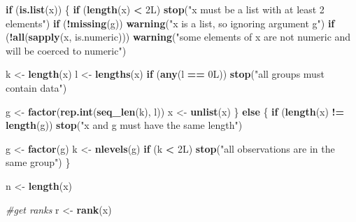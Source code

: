 \documentclass[
]{article}
\newenvironment{Shaded}{\begin{snugshade}}{\end{snugshade}}
\newcommand{\CommentTok}[1]{\textcolor[rgb]{0.56,0.35,0.01}{\textit{#1}}}
\newcommand{\ControlFlowTok}[1]{\textcolor[rgb]{0.13,0.29,0.53}{\textbf{#1}}}
\newcommand{\DataTypeTok}[1]{\textcolor[rgb]{0.13,0.29,0.53}{#1}}
\newcommand{\DecValTok}[1]{\textcolor[rgb]{0.00,0.00,0.81}{#1}}
\newcommand{\FunctionTok}[1]{\textcolor[rgb]{0.13,0.29,0.53}{\textbf{#1}}}
\newcommand{\NormalTok}[1]{#1}
\newcommand{\OtherTok}[1]{\textcolor[rgb]{0.56,0.35,0.01}{#1}}
\newcommand{\SpecialCharTok}[1]{\textcolor[rgb]{0.81,0.36,0.00}{\textbf{#1}}}
\newcommand{\StringTok}[1]{\textcolor[rgb]{0.31,0.60,0.02}{#1}}
\begin{document}
\begin{Shaded}
\begin{Highlighting}[]
  \ControlFlowTok{if}\NormalTok{ (}\FunctionTok{is.list}\NormalTok{(x)) \{}
    \ControlFlowTok{if}\NormalTok{ (}\FunctionTok{length}\NormalTok{(x) }\SpecialCharTok{\textless{}} \DecValTok{2}\DataTypeTok{L}\NormalTok{)}
      \FunctionTok{stop}\NormalTok{(}\StringTok{"\textquotesingle{}x\textquotesingle{} must be a list with at least 2 elements"}\NormalTok{)}
    \ControlFlowTok{if}\NormalTok{ (}\SpecialCharTok{!}\FunctionTok{missing}\NormalTok{(g))}
      \FunctionTok{warning}\NormalTok{(}\StringTok{"\textquotesingle{}x\textquotesingle{} is a list, so ignoring argument \textquotesingle{}g\textquotesingle{}"}\NormalTok{)}
    \ControlFlowTok{if}\NormalTok{ (}\SpecialCharTok{!}\FunctionTok{all}\NormalTok{(}\FunctionTok{sapply}\NormalTok{(x, is.numeric)))}
      \FunctionTok{warning}\NormalTok{(}\StringTok{"some elements of \textquotesingle{}x\textquotesingle{} are not numeric and will be coerced to numeric"}\NormalTok{)}
    
\NormalTok{    k }\OtherTok{\textless{}{-}} \FunctionTok{length}\NormalTok{(x)}
\NormalTok{    l }\OtherTok{\textless{}{-}} \FunctionTok{lengths}\NormalTok{(x)}
    \ControlFlowTok{if}\NormalTok{ (}\FunctionTok{any}\NormalTok{(l }\SpecialCharTok{==} \DecValTok{0}\DataTypeTok{L}\NormalTok{))}
      \FunctionTok{stop}\NormalTok{(}\StringTok{"all groups must contain data"}\NormalTok{)}
    
\NormalTok{    g }\OtherTok{\textless{}{-}} \FunctionTok{factor}\NormalTok{(}\FunctionTok{rep.int}\NormalTok{(}\FunctionTok{seq\_len}\NormalTok{(k), l))}
\NormalTok{    x }\OtherTok{\textless{}{-}} \FunctionTok{unlist}\NormalTok{(x)}
\NormalTok{  \} }\ControlFlowTok{else}\NormalTok{ \{}
    \ControlFlowTok{if}\NormalTok{ (}\FunctionTok{length}\NormalTok{(x) }\SpecialCharTok{!=} \FunctionTok{length}\NormalTok{(g))}
      \FunctionTok{stop}\NormalTok{(}\StringTok{"\textquotesingle{}x\textquotesingle{} and \textquotesingle{}g\textquotesingle{} must have the same length"}\NormalTok{)}
    
\NormalTok{    g }\OtherTok{\textless{}{-}} \FunctionTok{factor}\NormalTok{(g)}
\NormalTok{    k }\OtherTok{\textless{}{-}} \FunctionTok{nlevels}\NormalTok{(g)}
    \ControlFlowTok{if}\NormalTok{ (k }\SpecialCharTok{\textless{}} \DecValTok{2}\DataTypeTok{L}\NormalTok{)}
      \FunctionTok{stop}\NormalTok{(}\StringTok{"all observations are in the same group"}\NormalTok{)}
\NormalTok{  \}}
  
\NormalTok{  n }\OtherTok{\textless{}{-}} \FunctionTok{length}\NormalTok{(x)}

  \CommentTok{\#get ranks}
\NormalTok{  r }\OtherTok{\textless{}{-}} \FunctionTok{rank}\NormalTok{(x)}


\end{Highlighting}
\end{Shaded}
\end{document}
